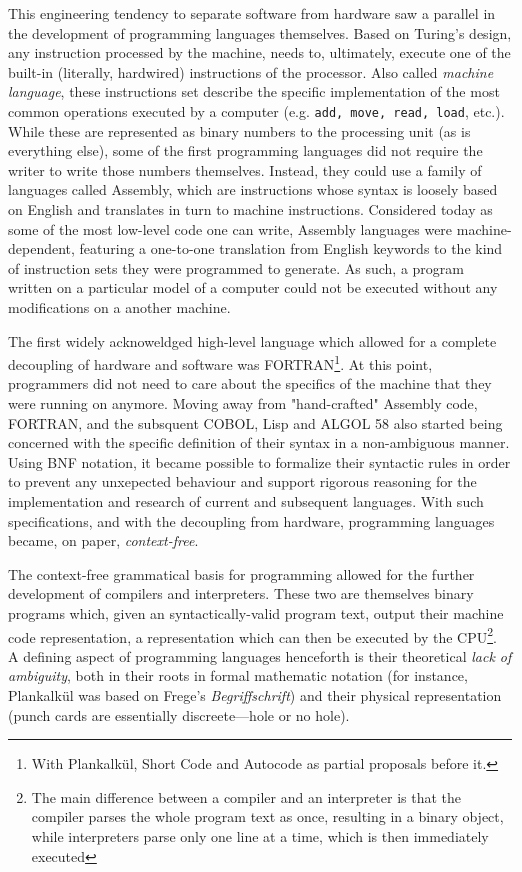 This engineering tendency to separate software from hardware saw a parallel in the development of programming languages themselves. Based on Turing's design, any instruction processed by the machine, needs to, ultimately, execute one of the built-in (literally, hardwired) instructions of the processor. Also called \emph{machine language}, these instructions set describe the specific implementation of the most common operations executed by a computer (e.g. \lstinline{add, move, read, load}, etc.). While these are represented as binary numbers to the processing unit (as is everything else), some of the first programming languages did not require the writer to write those numbers themselves. Instead, they could use a family of languages called Assembly, which are instructions whose syntax is loosely based on English and translates in turn to machine instructions. Considered today as some of the most low-level code one can write, Assembly languages were machine-dependent, featuring a one-to-one translation from English keywords to the kind of instruction sets they were programmed to generate. As such, a program written on a particular model of a computer could not be executed without any modifications on a another machine.

The first widely acknoweldged high-level language which allowed for a complete decoupling of hardware and software was FORTRAN\footnote{With Plankalkül, Short Code and Autocode as partial proposals before it.}. At this point, programmers did not need to care about the specifics of the machine that they were running on anymore. Moving away from "hand-crafted" Assembly code, FORTRAN, and the subsquent COBOL, Lisp and ALGOL 58 also started being concerned with the specific definition of their syntax in a non-ambiguous manner. Using BNF notation, it became possible to formalize their syntactic rules in order to prevent any unxepected behaviour and support rigorous reasoning for the implementation and research of current and subsequent languages. With such specifications, and with the decoupling from hardware, programming languages became, on paper, \emph{context-free}.

The context-free grammatical basis for programming allowed for the further development of compilers and interpreters. These two are themselves binary programs which, given an syntactically-valid program text, output their machine code representation, a representation which can then be executed by the CPU\footnote{The main difference between a compiler and an interpreter is that the compiler parses the whole program text as once, resulting in a binary object, while interpreters parse only one line at a time, which is then immediately executed}. A defining aspect of programming languages henceforth is their theoretical \emph{lack of ambiguity}, both in their roots in formal mathematic notation (for instance, Plankalkül was based on Frege's \emph{Begriffschrift}) and their physical representation (punch cards are essentially discreete—hole or no hole).

